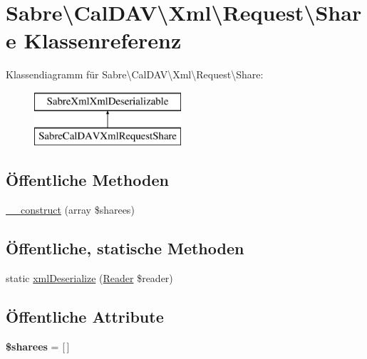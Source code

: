 \hypertarget{class_sabre_1_1_cal_d_a_v_1_1_xml_1_1_request_1_1_share}{}\section{Sabre\textbackslash{}Cal\+D\+AV\textbackslash{}Xml\textbackslash{}Request\textbackslash{}Share Klassenreferenz}
\label{class_sabre_1_1_cal_d_a_v_1_1_xml_1_1_request_1_1_share}
Klassendiagramm für Sabre\textbackslash{}Cal\+D\+AV\textbackslash{}Xml\textbackslash{}Request\textbackslash{}Share\+:\begin{figure}[H]
\begin{center}
\leavevmode
\includegraphics[height=2.000000cm]{class_sabre_1_1_cal_d_a_v_1_1_xml_1_1_request_1_1_share}
\end{center}
\end{figure}
\subsection*{Öffentliche Methoden}
\begin{DoxyCompactItemize}
\item 
\mbox{\hyperlink{class_sabre_1_1_cal_d_a_v_1_1_xml_1_1_request_1_1_share_af2d62c51390da2206d2506349ffdad64}{\+\_\+\+\_\+construct}} (array \$sharees)
\end{DoxyCompactItemize}
\subsection*{Öffentliche, statische Methoden}
\begin{DoxyCompactItemize}
\item 
static \mbox{\hyperlink{class_sabre_1_1_cal_d_a_v_1_1_xml_1_1_request_1_1_share_af07214cfef61954a95debec967682d5b}{xml\+Deserialize}} (\mbox{\hyperlink{class_sabre_1_1_xml_1_1_reader}{Reader}} \$reader)
\end{DoxyCompactItemize}
\subsection*{Öffentliche Attribute}
\begin{DoxyCompactItemize}
\item 
\mbox{\label{class_sabre_1_1_cal_d_a_v_1_1_xml_1_1_request_1_1_share_a27ea7ad1b21feebebeef402494658e54}} 
{\bfseries \$sharees} = \mbox{[}$\,$\mbox{]}
\end{DoxyCompactItemize}


